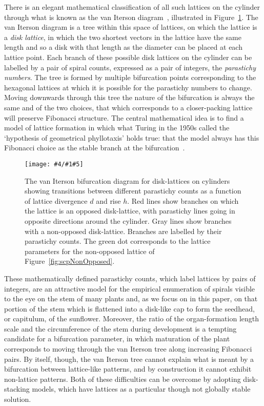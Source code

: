 \documentclass[a4paper,10pt]{amsart}
\newlength{\jfigwidth}
\newcommand{\pdffig}[3]{\jdofig{#1}{#2}{#3}{Figures}{.pdf}}
\newcommand{\jdofig}[5]{
	\begin{figure}\centering\texttt{[image: \#4/\#1\#5]} \caption{#2}\label{fig:#1}\end{figure}
}
\begin{document}
  There is an elegant mathematical  classification of all such lattices on the cylinder through what is known as the van Iterson diagram~\cite{vanitersonjrMathematischeUndMikroscopischAnatomische1907,swintonMathematicalPhyllotaxis2023}, illustrated in Figure~\ref{fig:scpVanIterson}.  The  van Iterson diagram is a tree within this space of lattices, on which the lattice is a \textit{disk lattice}, in which the two shortest vectors in the lattice have the same length and so a disk with that length as the diameter can be placed at each lattice point.  Each branch of these possible disk lattices on the cylinder can be labelled by a pair of spiral counts, expressed as a pair of integers, the \textit{parastichy numbers}. The tree is formed by multiple bifurcation points corresponding to the hexagonal lattices at which it is possible for the parastichy numbers to change. Moving downwards through this tree the nature of the bifurcation is always the same and of the two choices,
that which corresponds to a closer-packing lattice will preserve Fibonacci structure. The central mathematical idea is to find a model of lattice formation in which what Turing in the 1950s called the `hypothesis of geometrical phyllotaxis' holds true: that the model always has this Fibonacci choice as the stable branch at the bifurcation~\cite{swintonTuringMorphogenesisFibonacci2013}. 
\pdffig{scpVanIterson}{The van Iterson bifurcation diagram for disk-lattices on cylinders showing transitions between different parastichy counts as a function of lattice divergence $d$ and rise $h$. Red lines show branches on which the lattice is an opposed disk-lattice, with parastichy lines going in opposite directions around the cylinder. Gray lines show branches with a non-opposed disk-lattice. Branches are labelled by their parastichy counts.  The green dot corresponds to the lattice parameters for the non-opposed lattice of Figure~\ref{fig:scpNonOpposed}.}{1}%

These mathematically defined parastichy counts, which label lattices by pairs of integers, are an attractive model for the empirical enumeration of spirals visible to the eye on the stem of many plants and, as we focus on in this paper, on that portion of the stem which is flattened into a disk-like cap to form the seedhead, or capitulum, of the sunflower. 
    Moreover, the ratio of the organ-formation length scale and the circumference of the stem  during development is a tempting candidate for a bifurcation parameter, in which maturation of the plant corresponds to moving through the van Iterson tree along increasing Fibonacci pairs. 
 By itself, though, the van Iterson tree cannot explain what is meant by a bifurcation between lattice-like patterns, and by construction it cannot exhibit non-lattice patterns. Both of these difficulties can be overcome by adopting disk-stacking models, which have lattices as a particular though not globally stable solution.
 
\end{document}
